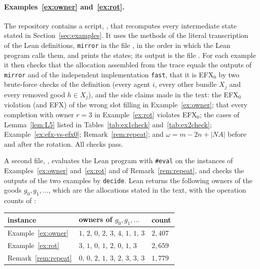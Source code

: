\documentclass[runningheads,11pt]{llncs}
\newcommand{\efxz}{\texorpdfstring{\mbox{EFX$_0$}}{EFX0}}
\newcommand{\NA}{\mathit{NA}}
\begin{document}
\paragraph{Examples~\ref{ex:owner} and~\ref{ex:rot}.} The repository contains a script, , that recomputes every intermediate state stated in Section~\ref{sec:examples}. It uses the methods of the literal transcription of the Lean definitions, \texttt{mirror} in the file , in the order in which the Lean program calls them, and prints the states; its output is the file . For each example it then checks that the allocation assembled from the trace equals the outputs of \texttt{mirror} and of the independent implementation \texttt{fast}, that it is \efxz{} by two brute-force checks of the definition (every agent $i$, every other bundle $X_j$ and every removed good $h\in X_j$), and the side claims made in the text: the \efxz{} violation (and EFX) of the wrong slot filling in Example~\ref{ex:owner}; that every completion with owner $r=3$ in Example~\ref{ex:rot} violates \efxz{}; the cases of Lemma~\ref{lem:L5} listed in Tables~\ref{tab:ex1check} and~\ref{tab:ex2check}; Example~\ref{ex:efx-vs-efx0}; Remark~\ref{rem:repeat}; and $\omega=m-2n+|\NA|$ before and after the rotation. All checks pass.

A second file, , evaluates the Lean program  with \texttt{\#eval} on the instances of Examples~\ref{ex:owner} and~\ref{ex:rot} and of Remark~\ref{rem:repeat}, and checks the outputs of the two examples by \texttt{decide}. Lean returns the following owners of the goods $g_0,g_1,\dots$, which are the allocations stated in the text, with the operation counts of :
\begin{center}\small
\setlength{\tabcolsep}{4pt}\begin{tabular}{@{}lll@{}}
\toprule
instance & owners of $g_0,g_1,\dots$ & count \\
\midrule
Example~\ref{ex:owner} & $1$, $2$, $0$, $2$, $3$, $4$, $1$, $1$, $3$ & $2{,}407$ \\
Example~\ref{ex:rot} & $3$, $1$, $0$, $1$, $2$, $0$, $1$, $3$ & $2{,}659$ \\
Remark~\ref{rem:repeat} & $0$, $0$, $2$, $1$, $3$, $2$, $3$, $3$, $3$ & $1{,}779$ \\
\bottomrule
\end{tabular}
\end{center}
\end{document}
